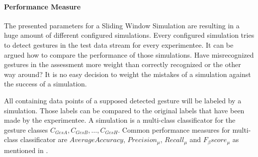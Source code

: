 \paragraph{Performance Measure} \label{performance_measure}
The presented parameters for a Sliding Window Simulation are resulting in a huge amount of different configured
simulations. Every configured simulation tries to detect gestures in the test data stream for every experimentee. It can
be argued how to compare the performance of those simulations. Have misrecognized gestures in the assessment more weight
than correctly recognized or the other way around? It is no easy decision to weight the mistakes of a simulation against
the success of a simulation.

All containing data points of a supposed detected gesture will be labeled by a simulation. Those labels can be compared
to the original labels that have been made by the experimentee. A simulation is a multi-class classificator for the
gesture classes $C_{GesA}, C_{GesB}, \dots, C_{GesH}$. Common performance measures for multi-class classificator are
$Average Accuracy$, $Precision_{\mu}$, $Recall_{\mu}$ and $F_{\beta}score_{\mu}$ as mentioned in
\cite{sokolova2009systematic}.
